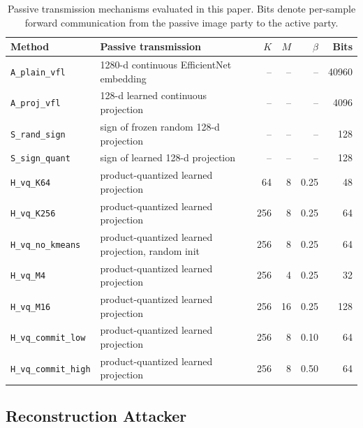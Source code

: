 \documentclass{article}
\begin{document}
\begin{table}[t]
\caption{Passive transmission mechanisms evaluated in this paper. Bits denote per-sample forward communication from the passive image party to the active party.}
\label{tab:method_grid}
\centering
\small
\setlength{\tabcolsep}{4pt}
\begin{tabular}{p{}p{}rrrr}
\toprule
Method & Passive transmission & $K$ & $M$ & $\beta$ & Bits \\
\midrule
\texttt{A\_plain\_vfl} & 1280-d continuous EfficientNet embedding & -- & -- & -- & 40960 \\
\texttt{A\_proj\_vfl} & 128-d learned continuous projection & -- & -- & -- & 4096 \\
\texttt{S\_rand\_sign} & sign of frozen random 128-d projection & -- & -- & -- & 128 \\
\texttt{S\_sign\_quant} & sign of learned 128-d projection & -- & -- & -- & 128 \\
\texttt{H\_vq\_K64} & product-quantized learned projection & 64 & 8 & 0.25 & 48 \\
\texttt{H\_vq\_K256} & product-quantized learned projection & 256 & 8 & 0.25 & 64 \\
\texttt{H\_vq\_no\_kmeans} & product-quantized learned projection, random init & 256 & 8 & 0.25 & 64 \\
\texttt{H\_vq\_M4} & product-quantized learned projection & 256 & 4 & 0.25 & 32 \\
\texttt{H\_vq\_M16} & product-quantized learned projection & 256 & 16 & 0.25 & 128 \\
\texttt{H\_vq\_commit\_low} & product-quantized learned projection & 256 & 8 & 0.10 & 64 \\
\texttt{H\_vq\_commit\_high} & product-quantized learned projection & 256 & 8 & 0.50 & 64 \\
\bottomrule
\end{tabular}
\end{table}

\subsection{Reconstruction Attacker}
\end{document}
